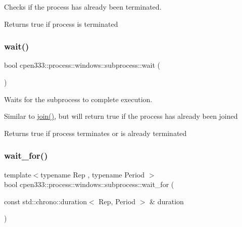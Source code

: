 Checks if the process has already been terminated. 

\begin{DoxyReturn}{Returns}
true if process is terminated 
\end{DoxyReturn}
\mbox{\label{classcpen333_1_1process_1_1windows_1_1subprocess_a54fe40167d1bf23bce4195c5aa34ec5f}} 
\subsubsection{\texorpdfstring{wait()}{wait()}}
{\footnotesize\ttfamily bool cpen333\+::process\+::windows\+::subprocess\+::wait (\begin{DoxyParamCaption}{ }\end{DoxyParamCaption})\hspace{0.3cm}{\ttfamily [inline]}}



Waits for the subprocess to complete execution. 

Similar to \hyperlink{classcpen333_1_1process_1_1windows_1_1subprocess_a973a466ad1f7299d1511e4a0628bc3f4}{join()}, but will return true if the process has already been joined

\begin{DoxyReturn}{Returns}
true if process terminates or is already terminated 
\end{DoxyReturn}
\mbox{\label{classcpen333_1_1process_1_1windows_1_1subprocess_aed7bf88b47dfa88ba8c97d6dbc94c124}} 
\subsubsection{\texorpdfstring{wait\+\_\+for()}{wait\_for()}}
{\footnotesize\ttfamily template$<$typename Rep , typename Period $>$ \\
bool cpen333\+::process\+::windows\+::subprocess\+::wait\+\_\+for (\begin{DoxyParamCaption}\item[{const std\+::chrono\+::duration$<$ Rep, Period $>$ \&}]{duration }\end{DoxyParamCaption})\hspace{0.3cm}{\ttfamily [inline]}}



